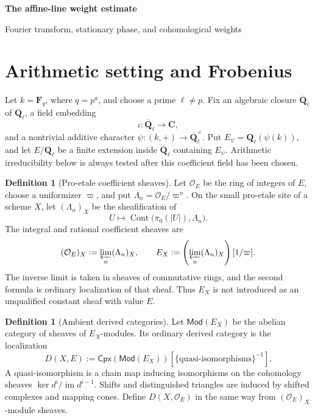 \documentclass[10pt]{article}
\theoremstyle{definition}
\newtheorem{definition}[theorem]{Definition}
\newcommand{\Fq}{\mathbf F_q}
\newcommand{\Ql}{\mathbf Q_\ell}
\newcommand{\Qlb}{\overline{\mathbf Q}_\ell}
\newcommand{\OO}{\mathcal O}
\begin{document}
\begin{center}
{\large\bfseries The affine-line weight estimate\par}
\medskip
{\normalsize Fourier transform, stationary phase, and cohomological weights\par}
\end{center}

\begin{abstract}
Laumon's affine-line estimate concerns compactly supported cohomology of a
type-3 lisse Weil sheaf.  The coefficient categories, Frobenius and Fourier
normalizations, real weights, middle extensions, and local exact sequence
are specified before the global and local conclusions are stated.
\end{abstract}

\tableofcontents

\section{Arithmetic setting and Frobenius}

Let \(k=\Fq\), where \(q=p^a\), and choose a prime
\(\ell\ne p\).  Fix an algebraic closure \(\Qlb\) of \(\Ql\), a field
embedding
\[
  \iota:\Qlb\longrightarrow\mathbf C,
\]
and a nontrivial additive character
\(\psi:(k,+)\to\Qlb^\times\).  Put
\(E_\psi=\Ql(\psi(k))\), and let \(E/\Ql\) be a finite extension inside
\(\Qlb\) containing \(E_\psi\).  Arithmetic irreducibility below is always
tested after this coefficient field has been chosen.
\begin{definition}[Pro-etale coefficient sheaves]
Let \(\OO_E\) be the ring of integers of \(E\), choose a uniformizer
\(\varpi\), and put \(\Lambda_n=\OO_E/\varpi^n\).  On the small pro-etale
site of a scheme \(X\), let \((\Lambda_n)_X\) be the sheafification of
\[
 U\longmapsto
 \operatorname{Cont}\bigl(\pi_0(|U|),\Lambda_n\bigr).
\]
The integral and rational coefficient sheaves are
\[
 (\OO_E)_X:=\varprojlim_n(\Lambda_n)_X,\qquad
 E_X:=\left(\varprojlim_n(\Lambda_n)_X\right)[1/\varpi].
\]
The inverse limit is taken in sheaves of commutative rings, and the second
formula is ordinary localization of that sheaf.  Thus \(E_X\) is not
introduced as an unqualified constant sheaf with value \(E\).
\end{definition}

\begin{definition}[Ambient derived categories]
Let \(\mathsf{Mod}(E_X)\) be the abelian category of sheaves of
\(E_X\)-modules.  Its ordinary derived category is the localization
\[
 D(X,E):=\mathsf{Cpx}(\mathsf{Mod}(E_X))
        [\{\text{quasi-isomorphisms}\}^{-1}].
\]
A quasi-isomorphism is a chain map inducing isomorphisms on the cohomology
sheaves \(\ker d^i/\operatorname{im}d^{i-1}\).  Shifts and distinguished
triangles are induced by shifted complexes and mapping cones.  Define
\(D(X,\OO_E)\) in the same way from \((\OO_E)_X\)-module sheaves.
\end{definition}
\end{document}
